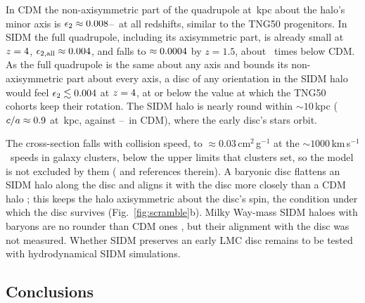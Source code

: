 \documentclass[fleqn,usenatbib,letters]{mnras}
\newcommand{\kms}{\,km\,s$^{-1}$}
\begin{document}
In CDM the non-axisymmetric part of the quadrupole at \ltREps\,kpc
about the halo's minor axis is $\epsilon_2\approx0.008$--\ltSiCdmNaHi\
at all redshifts, similar to the TNG50 progenitors. In SIDM the full
quadrupole, including its axisymmetric part, is already small at
$z=4$, $\epsilon_{2,\rm all}\approx0.004$, and falls to
$\approx0.0004$ by $z=1.5$, about \ltSiRatioLate\ times below CDM.
As the full quadrupole is the same about any axis and bounds its
non-axisymmetric part about every axis, a disc of any orientation in
the SIDM halo would feel $\epsilon_2\lesssim0.004$ at
$z=4$, at or below the value at which the TNG50 cohorts keep
their rotation. The SIDM halo is nearly round within $\sim10$\,kpc
($c/a\approx0.9$ at \ltREps\,kpc, against
\ltSiCaCdmLo--\ltSiCaCdmHi\ in CDM), where the early disc's stars
orbit.

The cross-section falls with collision speed, to
$\approx0.03$\,cm$^2$\,g$^{-1}$ at the $\sim1000$\kms\ speeds in galaxy
clusters, below the upper limits that clusters set, so the model is not
excluded by them (\citealt{Nadler2025} and references therein).
A baryonic disc flattens an SIDM halo along the disc and aligns it
with the disc more closely than a CDM halo \citep{Sameie2018}; this keeps
the halo axisymmetric about the disc's spin, the condition under which
the disc survives (Fig.~\ref{fig:scramble}b). Milky Way-mass SIDM haloes
with baryons are no rounder than CDM ones \citep{Vargya2022}, but their
alignment with the disc was not measured. Whether SIDM preserves an early LMC disc
remains to be tested with hydrodynamical SIDM simulations.

\subsection{Conclusions}\label{sec:conclusions}
\end{document}
